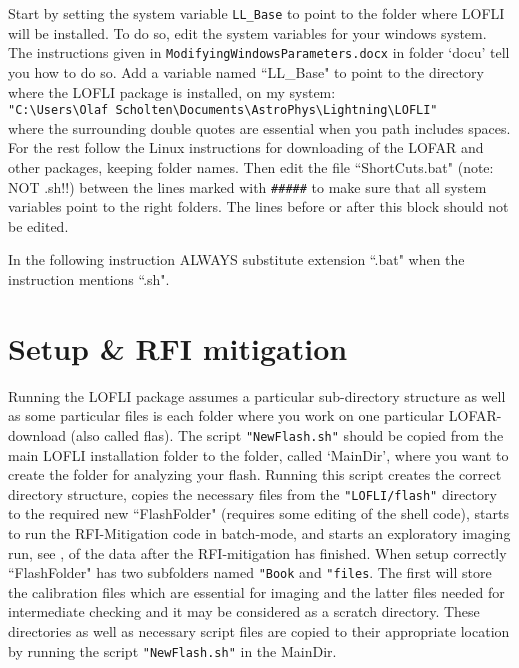 Start by setting the system variable {\small \verb!LL_Base! } to point to the folder where LOFLI will be installed. To do so, edit the system variables for your windows system. The instructions given in {\small \verb!ModifyingWindowsParameters.docx! } in folder `docu' tell you how to do so. Add a variable named ``LL\_Base" to point to the directory where the LOFLI package is installed, on my system:\\
{\small \verb!"C:\Users\Olaf Scholten\Documents\AstroPhys\Lightning\LOFLI"! }\\
where the surrounding double quotes are essential when you path includes spaces.
For the rest follow the Linux instructions for downloading of the LOFAR and other packages, keeping folder names. Then edit the file ``ShortCuts.bat" (note: NOT .sh!!) between the lines marked with {\small \verb!#####! } to make sure that all system variables point to the right folders. The lines before or after this block should not be edited.

In the following instruction ALWAYS substitute extension ``.bat" when the instruction mentions  ``.sh".


\chapter{Setup \& RFI mitigation}

Running the LOFLI package assumes a particular sub-directory structure as well as some particular files is each folder where you work on one particular LOFAR-download (also called flas). The script \verb!"NewFlash.sh"! should be copied from the main LOFLI installation folder to the folder, called `MainDir', where you want to create the folder for analyzing your flash. Running this script creates the correct directory structure, copies the necessary files from the \verb!"LOFLI/flash"! directory to the required new ``FlashFolder" (requires some editing of the shell code), starts to run the RFI-Mitigation code in batch-mode, and starts an exploratory imaging run, see , of the data after the RFI-mitigation has finished.
When setup correctly ``FlashFolder"  has two subfolders named \verb!"Book! and \verb!"files!. The first will store the calibration files which are essential for imaging and the latter files needed for intermediate checking and it may be considered as a scratch directory. These directories as well as necessary script files are copied to their appropriate location by running the script \verb!"NewFlash.sh"! in the MainDir.


